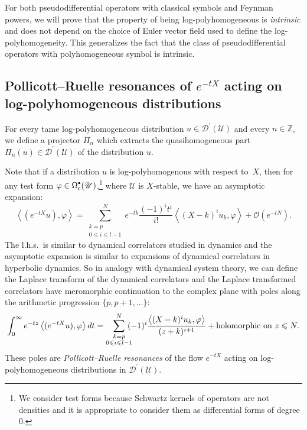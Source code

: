 \documentclass[JEP,XML,SOM,Unicode]{cedram}
\let\pazocal\mathscr
\newcommand{\sbullet}{{\raisebox{1pt}{$\scriptscriptstyle\bullet$}}}
\theoremstyle{definition}
\newcommand\cD{{\pazocal D}}
\renewcommand\c{\mathrm{c}}
\let\euler X
\let\exd u
\let\Re\relax
\DeclareMathOperator{\Re}{Re}
\begin{document}
For both pseudodifferential operators with classical symbols and Feynman powers,
we will prove that the property of being log-polyhomogeneous is \emph{intrinsic} and does not depend on the
choice of Euler vector field used to define the log-polyhomogeneity. This generalizes the fact that the class of pseudodifferential operators
with polyhomogeneous symbol is intrinsic.

\subsection{Pollicott--Ruelle resonances of \texorpdfstring{$e^{-t\euler}$}{exp(-tX)} acting on log-polyhomogeneous distributions}

For every tame log-polyhomogeneous distribution $\exd \in \cD^\prime(\pazocal{U})$ and every $n\in \mathbb{Z}$, we define a projector
$\Pi_n$ which extracts the quasihomogeneous part $\Pi_n(\exd) \in \cD^\prime(\pazocal{U})$ of the distribution $\exd$.

Note that if a distribution $u$ is log-polyhomogenous with respect to~$\euler$, then for any test form $\varphi\in \Omega^{\sbullet}_\c(\pazocal{U})$,\footnote{We consider test forms because Schwartz kernels of operators are not densities and it is appropriate to consider them as differential forms of degree $0$.}
where $\pazocal{U}$ is $\euler$-stable,
we have an asymptotic expansion:
\[
\left\langle (e^{-t\euler}u),\varphi\right\rangle = \sum_{\substack{k=p\\0\leqslant i\leqslant l-1}}^N e^{-tk}\frac{(-1)^it^i}{i!} \left\langle (\euler-k)^iu_{k},\varphi\right\rangle+\pazocal{O}(e^{-tN}).
\]
The l.h.s.~is similar to dynamical correlators studied in dynamics and the asymptotic expansion is similar
to expansions of dynamical correlators in hyperbolic dynamics.
So in analogy with dynamical system theory, we can define the Laplace transform
of the dynamical correlators and the Laplace transformed
correlators have meromorphic continuation to the complex plane with poles
along the arithmetic
progression \hbox{$\{p,p+1,\dots \}$}:
\[
\int_0^\infty e^{-tz}\left\langle (e^{-t\euler}u),\varphi\right\rangle dt=
\sum_{\substack{k=p\\0\leqslant i\leqslant l-1}}^N \hspace*{-2mm}(-1)^i \frac{\left\langle (\euler-k)^i u_{k},\varphi\right\rangle}{(z+k)^{{i+1}}}+\text{holomorphic on }\Re z\leqslant N.
\]
These poles are \emph{Pollicott--Ruelle resonances} of the flow $e^{-t\euler}$ acting on
log-poly\-homogeneous distributions in $\pazocal{D}^\prime(\pazocal{U})$.
\end{document}

